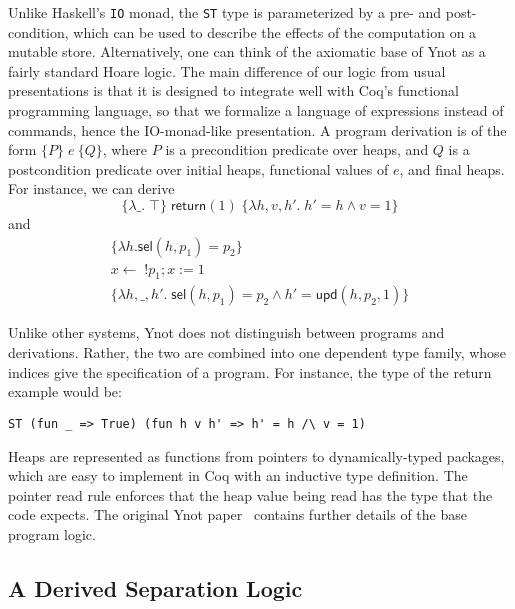 \documentclass[preprint,nocopyrightspace]{sigplanconf}
\newcommand{\cd}[1]{\texttt{#1}}
\newcommand{\coq}[1]{\mathsf{#1}}
\newcommand{\return}[1]{\coq{return}(#1)}
\newcommand{\bind}{\leftarrow}
\newcommand{\rd}[1]{!#1}
\newcommand{\wri}[2]{#1 := #2}
\begin{document}
Unlike Haskell's \cd{IO} monad, the \cd{ST} type is parameterized by a pre- and post- condition, which can be used to describe the effects of the computation on a mutable store.  Alternatively, one can think of the axiomatic base of Ynot as a fairly standard Hoare logic.  The main difference of our logic from usual presentations is that it is designed to integrate well with Coq's functional programming language, so that we formalize a language of expressions instead of commands, hence the IO-monad-like presentation.  A program derivation is of the form $\{P\} \; e \: \{Q\}$, where $P$ is a precondition predicate over heaps, and $Q$ is a postcondition predicate over initial heaps, functional values of $e$, and final heaps.  For instance, we can derive
$$\{\lambda \_. \; \top\} \; \return{1} \; \{\lambda h, v, h'. \; h' = h \land v = 1\}$$
and
$$\begin{array}{c}
  \{\lambda h. \coq{sel}(h, p_1) = p_2\} \\
  x \bind \; \rd{p_1}; \wri{x}{1} \\
  \{\lambda h, \_, h'. \; \coq{sel}(h, p_1) = p_2 \land h' = \coq{upd}(h, p_2, 1)\}
\end{array}$$

Unlike other systems, Ynot does not distinguish between programs and derivations. Rather, the two are combined into one dependent type family, whose indices give the specification of a program.  For instance, the type of the return example would be:
\begin{verbatim}
ST (fun _ => True) (fun h v h' => h' = h /\ v = 1)
\end{verbatim}

Heaps are represented as functions from pointers to dynamically-typed packages, which are easy to implement in Coq with an inductive type definition.  The pointer read rule enforces that the heap value being read has the type that the code expects.  The original Ynot paper~\cite{ynot:icfp} contains further details of the base program logic.


\subsection{A Derived Separation Logic}
\end{document}
